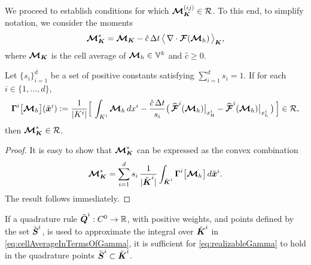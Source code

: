 We proceed to establish conditions for which $\boldsymbol{\mathcal{M}}_{\boldsymbol{K}}^{(ij)}\in\mathcal{R}$.  
To this end, to simplify notation, we consider the moments
\begin{equation}
  \boldsymbol{\mathcal{M}}_{\boldsymbol{K}}^{*}
  =\boldsymbol{\mathcal{M}}_{\boldsymbol{K}}-\hat{c}\,\Delta t\,\big\langle\,\nabla\cdot\boldsymbol{\mathcal{F}}(\boldsymbol{\mathcal{M}}_{h})\,\big\rangle_{\boldsymbol{K}},
\end{equation}
where $\boldsymbol{\mathcal{M}}_{\boldsymbol{K}}$ is the cell average of $\boldsymbol{\mathcal{M}}_{h}\in\mathbb{V}^{k}$ and $\hat{c}\ge0$.  
\begin{lemma}
  Let $\{s_{i}\}_{i=1}^{d}$ be a set of positive constants satisfying $\sum_{i=1}^{d}s_{i}=1$.  
  If for each $i\in\{1,\ldots,d\}$, 
  \begin{equation}
    \boldsymbol{\Gamma}^{i}\big[\boldsymbol{\mathcal{M}}_{h}\big](\tilde{\boldsymbol{x}}^{i})
    :=\frac{1}{|K^{i}|}
    \Big[\,\int_{K^{i}}\boldsymbol{\mathcal{M}}_{h}\,dx^{i}-\frac{\hat{c}\,\Delta t}{s_{i}}\big(\,\widehat{\boldsymbol{\mathcal{F}}}^{i}(\boldsymbol{\mathcal{M}}_{h})\big|_{x_{\mbox{\tiny H}}^{i}}-\widehat{\boldsymbol{\mathcal{F}}}^{i}(\boldsymbol{\mathcal{M}}_{h})\big|_{x_{\mbox{\tiny L}}^{i}}\,\big)\,\Big]\in\mathcal{R},
    \label{eq:realizableGamma}
  \end{equation}
  then $\boldsymbol{\mathcal{M}}_{\boldsymbol{K}}^{*}\in\mathcal{R}$.  
\end{lemma}
\begin{proof}
  It is easy to show that $\boldsymbol{\mathcal{M}}_{\boldsymbol{K}}^{*}$ can be expressed as the convex combination
  \begin{equation}
    \boldsymbol{\mathcal{M}}_{\boldsymbol{K}}^{*}
    =\sum_{i=1}^{d}s_{i}\,\frac{1}{|\tilde{\boldsymbol{\boldsymbol{K}}}^{i}|}\int_{\tilde{\boldsymbol{K}}^{i}}\boldsymbol{\Gamma}^{i}\big[\boldsymbol{\mathcal{M}}_{h}\big]\,d\tilde{\boldsymbol{x}}^{i}.  
    \label{eq:cellAverageInTermsOfGamma}
  \end{equation}
  The result follows immediately.  
\end{proof}
\begin{rem}
  If a quadrature rule $\tilde{\boldsymbol{Q}}^{i}:C^{0}\to\mathbb{R}$, with positive weights, and points defined by the set $\tilde{\boldsymbol{S}}^{i}$, is used to approximate the integral over $\tilde{\boldsymbol{K}}^{i}$ in \eqref{eq:cellAverageInTermsOfGamma}, it is sufficient for \eqref{eq:realizableGamma} to hold in the quadrature points $\tilde{\boldsymbol{S}}^{i}\subset\tilde{\boldsymbol{K}}^{i}$.  
\end{rem}

